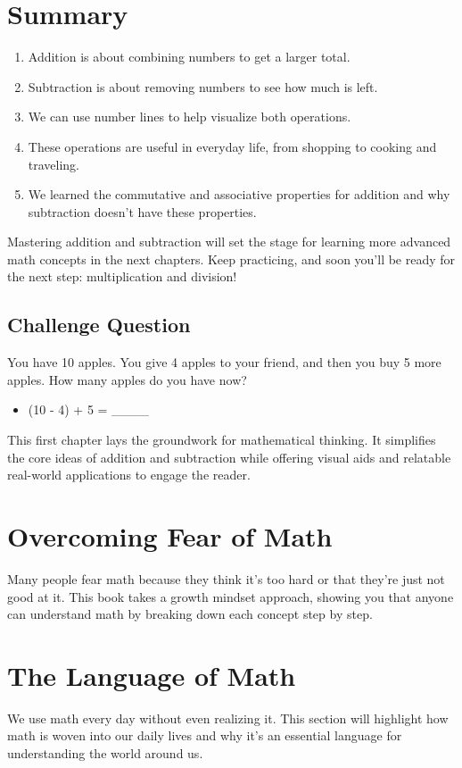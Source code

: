 \documentclass{book}
\begin{document}
\section{Summary}
\begin{enumerate}
    \item Addition is about combining numbers to get a larger total.
    \item Subtraction is about removing numbers to see how much is left.
    \item We can use number lines to help visualize both operations.
    \item These operations are useful in everyday life, from shopping to cooking and traveling.
    \item We learned the commutative and associative properties for addition and why subtraction doesn’t have these properties.
\end{enumerate}

Mastering addition and subtraction will set the stage for learning more advanced math concepts in the next chapters. Keep practicing, and soon you’ll be ready for the next step: multiplication and division!

\subsection{Challenge Question}
You have 10 apples. You give 4 apples to your friend, and then you buy 5 more apples. How many apples do you have now?
\begin{itemize}
    \item (10 - 4) + 5 = \_\_\_\_
\end{itemize}

This first chapter lays the groundwork for mathematical thinking. It simplifies the core ideas of addition and subtraction while offering visual aids and relatable real-world applications to engage the reader.

\section{Overcoming Fear of Math}

Many people fear math because they think it’s too hard or that they’re just not good at it. This book takes a growth mindset approach, showing you that anyone can understand math by breaking down each concept step by step.

\section{The Language of Math}
We use math every day without even realizing it. This section will highlight how math is woven into our daily lives and why it’s an essential language for understanding the world around us.
\end{document}

